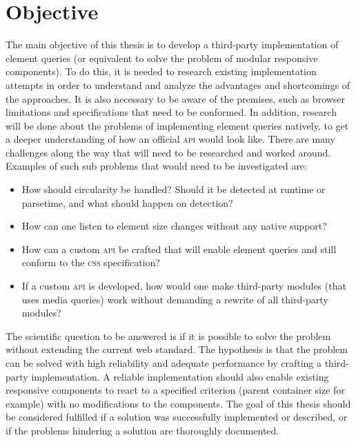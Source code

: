 \documentclass[a4paper,11pt]{kth-mag}
\begin{document}
    \section{Objective}
      The main objective of this thesis is to develop a third-party implementation of element queries (or equivalent to solve the problem of modular responsive components).
      To do this, it is needed to research existing implementation attempts in order to understand and analyze the advantages and shortcomings of the approaches.
      It is also necessary to be aware of the premises, such as browser limitations and specifications that need to be conformed.
      In addition, research will be done about the problems of implementing element queries natively, to get a deeper understanding of how an official \textsc{api} would look like.
      There are many challenges along the way that will need to be researched and worked around.
      Examples of such sub problems that would need to be investigated are:
      \begin{itemize}
        \item How should circularity be handled? Should it be detected at runtime or parsetime, and what should happen on detection?
        \item How can one listen to element size changes without any native support?
        \item How can a custom \textsc{api} be crafted that will enable element queries and still conform to the \textsc{css} specification?
        \item If a custom \textsc{api} is developed, how would one make third-party modules (that uses media queries) work without demanding a rewrite of all third-party modules?
      \end{itemize}
      The scientific question to be answered is if it is possible to solve the problem  without extending the current web standard.
      The hypothesis is that the problem can be solved with high reliability and adequate performance by crafting a third-party implementation.
      A reliable implementation should also enable existing responsive components to react to a specified criterion (parent container size for example) with no modifications to the components.
      The goal of this thesis should be considered fulfilled if a solution was successfully implemented or described, or if the problems hindering a solution are thoroughly documented.
\end{document}
